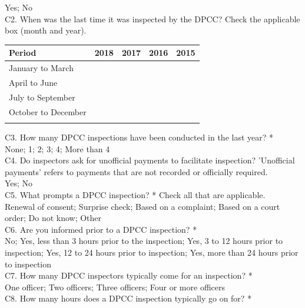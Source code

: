 \documentclass[a4paper, 12pt, twoside]{article}
\begin{document}
\begin{mdframed}[backgroundcolor=gray!20]
		Yes; No \\
		
		C2. When was the last time it was inspected by the DPCC? Check the applicable box (month and year).\\	
		
		\begin{tabular}{lrrrr}
		\toprule
		Period & 2018 & 2017 & 2016 & 2015\\
		\midrule
		January to March &  &  &  & \\
		April to June &  &  &  & \\
		July to September &  &  &  & \\
		October to December &  &  &  & \\
		\bottomrule \\
		\end{tabular}
		
		C3. How many DPCC inspections have been conducted in the last year? * \\
		
		None; 1; 2; 3; 4; More than 4 \\
		
		C4. Do inspectors ask for unofficial payments to facilitate inspection? 'Unofficial payments' refers to payments that are not recorded or officially required. \\
		
		Yes; No \\
		
		C5. What prompts a DPCC inspection? * Check all that are applicable. \\
		
		Renewal of consent; Surprise check; Based on a complaint; Based on a court order; Do not know; Other \\
		
		C6. Are you informed prior to a DPCC inspection? * \\
		
		No; Yes, less than 3 hours prior to the inspection; Yes, 3 to 12 hours prior to inspection; Yes, 12 to 24 hours prior to inspection; Yes, more than 24 hours prior to inspection \\
		
		C7. How many DPCC inspectors typically come for an inspection? *  \\
		
		One officer; Two officers; Three officers; Four or more officers \\
		
		C8. How many hours does a DPCC inspection typically go on for? * \\
		

\end{mdframed}
\end{document}
